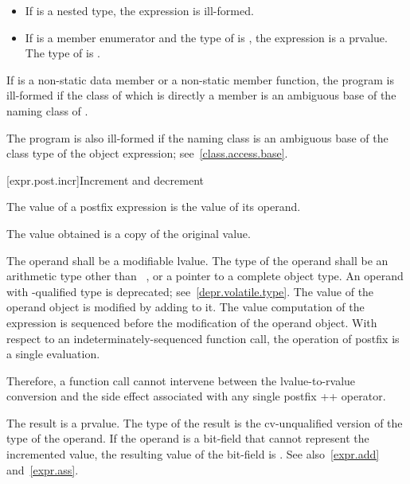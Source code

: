 \begin{itemize}
\item If  is a nested type, the expression  is
ill-formed.

\item If  is a member enumerator and the type of 
is , the expression  is a prvalue. The type of
 is .
\end{itemize}

\pnum
If  is a non-static data member or a non-static member
function, the program is ill-formed if the class of which  is
directly a member is an ambiguous base of
the naming class of .
\begin{note}
The program is also ill-formed if the naming class is an ambiguous base of the class type
of the object expression; see~\ref{class.access.base}.
\end{note}

[expr.post.incr]{Increment and decrement}

\pnum
{}%
%
%
%
The value of a postfix \tcode{++} expression is the value of its
operand.
\begin{note}
The value obtained is a copy of the original value.
\end{note}
The operand shall be a modifiable lvalue. The type of the operand shall
be an arithmetic type other than \cv{}~,
or a pointer to a complete object type.
An operand with -qualified type is deprecated;
see~\ref{depr.volatile.type}.
The value of the operand object is modified
by adding  to it.
The
%
value computation of the \tcode{++} expression is sequenced before the
modification of the operand object. With respect to an
indeterminately-sequenced function call, the operation of postfix
\tcode{++} is
a single evaluation.
\begin{note}
Therefore, a function call cannot intervene between the
lvalue-to-rvalue conversion and the side effect associated with any
single postfix ++ operator.
\end{note}
The result is a prvalue. The type of the result is the cv-unqualified
version of the type of the operand.
If the operand is a bit-field that cannot represent the incremented value, the
resulting value of the bit-field is
.
See also~\ref{expr.add}
and~\ref{expr.ass}.

